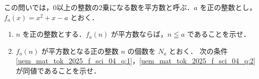﻿\documentclass[../../../uem_mat_tok_q.tex]{subfiles}
\begin{document}
    この問いでは，0以上の整数の2乗になる数を平方数と呼ぶ．$a$ を正の整数とし，%
    $f_a(x)=x^2+x-a$ とおく．

    \begin{enumerate}
        \item $n$ を正の整数とする．$f_a(n)$ が平方数ならば，$n\leqq a$ であることを示せ．
        \item $f_a(n)$ が平方数となる正の整数 $n$ の個数を $N_a$ とおく．%
            次の条件\,\ref{uem_mat_tok_2025_f_sci_04_q:1}，\ref{uem_mat_tok_2025_f_sci_04_q:2}\,%
            が同値であることを示せ．
            
    \end{enumerate}
\end{document}
